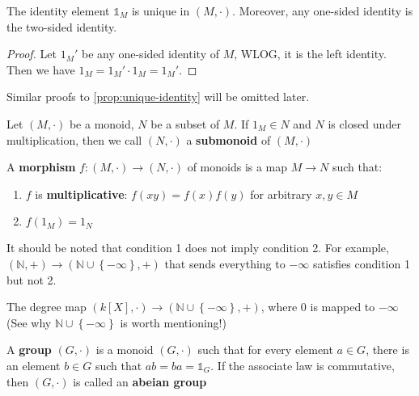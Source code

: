 \documentclass{note-eng}
\begin{document}
\begin{proposition} \label{prop:unique-identity}
    The identity element $\mathds{1}_M$ is unique in $(M, \cdot)$. Moreover, any one-sided identity is the two-sided identity.
\end{proposition}

\begin{proof}
    Let $1_{M}'$ be any one-sided identity of $M$, WLOG, it is the left identity. Then we have $1_M = 1_{M}' \cdot 1_M = 1_{M}'$.
\end{proof}

Similar proofs to \ref{prop:unique-identity} will be omitted later.

\begin{definition}[Submonoid]
    Let $(M, \cdot)$ be a monoid, $N$ be a subset of $M$. If $1_M \in N$ and $N$ is closed under multiplication, then we call $(N, \cdot)$ a \textbf{submonoid} of $(M, \cdot)$
\end{definition}

\begin{definition}
    A \textbf{morphism} $f: (M, \cdot) \rightarrow (N, \cdot)$ of monoids is a map $M \rightarrow N$ such that:
    \begin{enumerate}
        \item $f$ is \textbf{multiplicative}: $f(xy) = f(x) f(y)$ for arbitrary $x, y \in M$
        \item $f(1_M) = 1_N$
    \end{enumerate}
\end{definition}

\begin{remark}
    It should be noted that condition 1 does not imply condition 2. For example, $(\mathbb{N}, +) \rightarrow (\mathbb{N} \cup \left\lbrace -\infty \right\rbrace, +)$ that sends everything to $-\infty$ satisfies condition 1 but not 2.
\end{remark}

\begin{example}
    The degree map $(k[X], \cdot) \rightarrow (\mathbb{N} \cup \left\lbrace -\infty \right\rbrace, +)$, where $0$ is mapped to $-\infty$ (See why $\mathbb{N} \cup \left\lbrace -\infty \right\rbrace$ is worth mentioning!)
\end{example}

\begin{definition}
    A \textbf{group} $(G, \cdot)$ is a monoid $(G, \cdot)$ such that for every element $a \in G$, there is an element $b \in G$ such that $ab = ba = \mathds{1}_G$. If the associate law is commutative, then $(G, \cdot)$ is called an \textbf{abeian group}
\end{definition}
\end{document}
